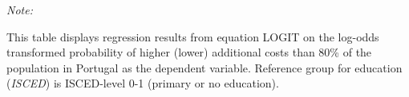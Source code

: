 \begin{table}[htbp!]
\begin{adjustbox}{width = 1\textwidth, max height = 0.95\textheight, center}
\begin{threeparttable}[b]
         \begin{tablenotes}\item \medskip \textit{Note:}
            \item This table displays regression results from equation LOGIT on the log-odds transformed probability of higher (lower) additional costs than 80\% of the population in Portugal as the dependent variable. Reference group for education (\textit{ISCED}) is ISCED-level 0-1 (primary or no education).
         \end{tablenotes}
      \end{threeparttable}
   \end{adjustbox}
\end{table}


